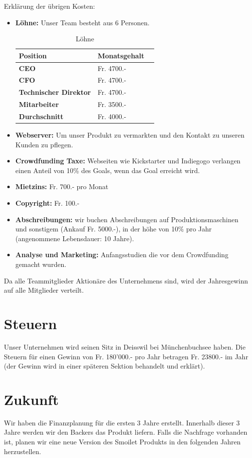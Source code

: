 Erkl\"arung der \"ubrigen Kosten:\\
\begin{itemize}
\item \textbf{L\"ohne:} Unser Team besteht aus 6 Personen. \\
\begin{table}[H]
\centering
\caption{L\"ohne}
\label{L\"ohne}
\begin{tabular}{lll}
\textbf{Position} & \textbf{Monatsgehalt}  \\ \hline
  \textbf{CEO} &  Fr. 4700.- \\ \hline
 \textbf{CFO} &  Fr. 4700.- \\ \hline
 \textbf{Technischer Direktor}& Fr. 4700.-  \\ \hline
 \textbf{Mitarbeiter} &Fr.  3500.- \\ \hline
 \textbf{Durchschnitt} & Fr. 4000.-\\ \hline
\end{tabular}
\end{table}
\item \textbf{Webserver:} Um unser Produkt zu vermarkten und den Kontakt zu unseren Kunden zu pflegen.

\item \textbf{Crowdfunding Taxe:} Webseiten wie Kickstarter und Indiegogo verlangen einen Anteil von 10\% des Goals, wenn das Goal erreicht wird.
\item \textbf{Mietzins:} Fr. 700.- pro Monat
\item \textbf{Copyright:} Fr. 100.-
\item \textbf{Abschreibungen:} wir buchen Abschreibungen auf Produktionsmaschinen und sonstigem (Ankauf Fr. 5000.-), in der h\"ohe von 10\% pro Jahr (angenommene Lebensdauer: 10 Jahre).
\item \textbf{Analyse und Marketing:} Anfangsstudien die vor dem Crowdfunding gemacht wurden.
\end{itemize}
Da alle Teammitglieder Aktion\"are des Unternehmens sind, wird der Jahresgewinn auf alle Mitglieder verteilt.
\section{Steuern}
Unser Unternehmen wird seinen Sitz in Deisswil bei M\"unchenbuchsee haben. Die Steuern f\"ur einen Gewinn von Fr. 180'000.- pro Jahr betragen Fr. 23800.- im Jahr (der Gewinn wird in einer sp\"ateren Sektion behandelt und erkl\"art).
\section{Zukunft}
Wir haben die Finanzplanung f\"ur die ersten 3 Jahre erstellt. Innerhalb dieser 3 Jahre werden wir den Backers das Produkt liefern. Falls die Nachfrage vorhanden ist, planen wir eine neue Version des Smoilet Produkts in den folgenden Jahren herzustellen. 
